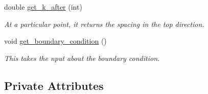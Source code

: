 \begin{DoxyCompactItemize}
double \hyperlink{class_compute_matrix_aca571a6ea7337ea7a2e581eeb29c3edb}{get\+\_\+k\+\_\+after} (int)
\begin{DoxyCompactList}\small\item\em At a particular point, it returns the spacing in the top direction. \end{DoxyCompactList}\item 
void \hyperlink{class_compute_matrix_a01bd56d57608380a263f0ae4701a2634}{get\+\_\+boundary\+\_\+condition} ()
\begin{DoxyCompactList}\small\item\em This takes the nput about the boundary condition. \end{DoxyCompactList}\end{DoxyCompactItemize}
\subsection*{Private Attributes}
